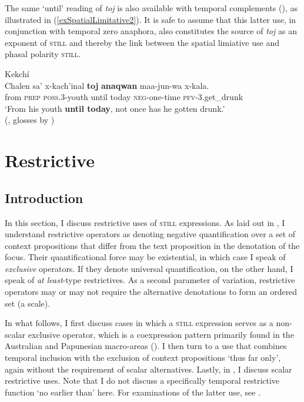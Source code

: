 The same \lq until\rq{ }reading of \textit{toj} is also available with temporal complements (), as illustrated in (\ref{exSpatialLimitative2}). It is safe to assume that this latter use, in conjunction with temporal zero anaphora, also constitutes the source of \textit{toj} as an exponent of \textsc{still} and thereby the link between the spatial limiative use and phasal polarity \textsc{still}.\largerpage

\begin{exe}
	\ex Kekchí\label{exSpatialLimitative2}\\
	\gll Chalen sa' x-kach'inal \textbf{toj} \textbf{anaqwan} maa-jun-wa x-kala.\\
	from \textsc{prep} \textsc{poss}.3-youth until today \textsc{neg}-one-time \textsc{pfv}-3.get\_drunk\\
		\glt \lq From his youth \textbf{until today}, not once has he gotten drunk.\rq
		\\(\cite[197]{EachusCarlson1980}, glosses by \cite[463]{Kockelman2020})
\end{exe}

\section{Restrictive}
\label{sectionRestrictiveUebergeordnet}
\subsection{Introduction}
In this section, I discuss restrictive uses of \textsc{still} expressions. As laid out in  , I understand restrictive operators as denoting negative quantification over a set of context propositions that differ from the text proposition in the denotation of the focus. Their quantificational force may be existential, in which case I speak of \textit{exclusive} operators. If they denote universal quantification, on the other hand, I speak of \textit{at least}-type restrictives. As a second parameter of variation, restrictive operators may or may not require the alternative denotations to form an ordered set (a scale).

In what follows, I first discuss cases in which a \textsc{still} expression serves as a non-scalar exclusive operator, which is a coexpression pattern primarily found in the Australian and Papunesian macro-areas (). I then turn to a use that combines temporal inclusion with the exclusion of context propositions \lq thus far only\rq{}, again without the requirement of scalar alternatives. Lastly, in , I discuss scalar restrictive uses. Note that I do not discuss a specifically temporal restrictive function \lq no earlier than\rq{ }here. For examinations of the latter use, see .

